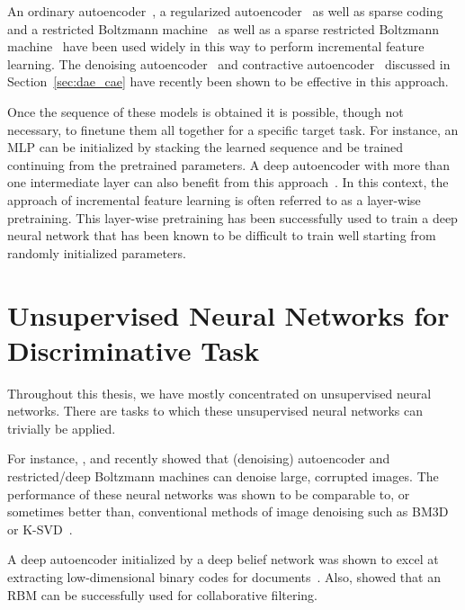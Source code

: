 \documentclass{now}
\begin{document}
An ordinary autoencoder~\citep[see, e.g.,][and
Section~\ref{sec:autoencoders}]{Bengio2007nips}, a regularized
autoencoder~\citep[see, e.g.,][and Section~\ref{sec:spaenc}]{Ranzato2008} as
well as sparse coding~\citep[see, e.g.,][and
Section~\ref{sec:sparse_coding}]{Raina2007} and a restricted Boltzmann
machine~\citep[see, e.g.,][and Section~\ref{sec:rbm}]{Hinton2006} as well as a
sparse restricted Boltzmann machine~\citep[see, e.g.,][]{Lee2007} have been used
widely in this way to perform incremental feature learning. The denoising
autoencoder~\citep{Vincent2010} and contractive autoencoder~\citep{Rifai2011}
discussed in Section~\ref{sec:dae_cae} have recently been shown to be effective
in this approach.

Once the sequence of these models is obtained it is possible, though not
necessary, to finetune them all together for a specific target task. For
instance, an MLP can be initialized by stacking the learned sequence and be
trained continuing from the pretrained parameters.  A deep autoencoder with more
than one intermediate layer can also benefit from this
approach~\citep{Hinton2006}. In this context, the approach of incremental
feature learning is often referred to as a layer-wise pretraining. This
layer-wise pretraining has been successfully used to train a deep neural network
that has been known to be difficult to train well starting from randomly
initialized parameters.

\section{Unsupervised Neural Networks for Discriminative Task}
\label{sec:dunn}

Throughout this thesis, we have mostly concentrated on unsupervised neural
networks.  There are tasks to which these unsupervised neural networks can
trivially be applied.

For instance, \citet{Burger2012}, \citet{Xie2012} and \citet{Cho13ICANN2}
recently showed that (denoising) autoencoder and restricted/deep Boltzmann
machines can denoise large, corrupted images.  The performance of these neural
networks was shown to be comparable to, or sometimes better than, conventional
methods of image denoising such as BM3D~\citep{Dabov2007} or
K-SVD~\citep{Portilla2003}.  

A deep autoencoder initialized by a deep belief network was shown to excel at
extracting low-dimensional binary codes for
documents~\citep{Salakhutdinov2009s}.  Also, \citet{Salakhutdinov2007} showed
that an RBM can be successfully used for collaborative filtering. 
\end{document}
